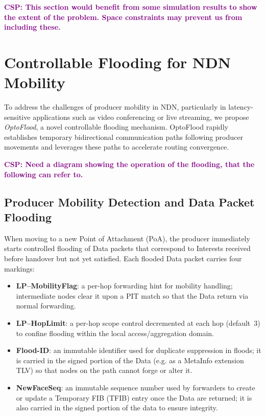 \documentclass[10pt,conference]{IEEEtran}
\newcommand{\csp}[1]{\textbf{\textcolor{purple}{CSP: #1}}}
\begin{document}
\csp{This section would benefit from some simulation results to show the extent of the problem. Space constraints may prevent us from including these.}

\section{Controllable Flooding for NDN Mobility} 
\label{sec:solution}

To address the challenges of producer mobility in NDN, particularly in latency-sensitive applications such as video conferencing or live streaming, we propose \textit{OptoFlood}, a novel controllable flooding mechanism. OptoFlood rapidly establishes temporary bidirectional communication paths following producer movements and leverages these paths to accelerate routing convergence.

\csp{Need a diagram showing the operation of the flooding, that the following can refer to.}

\subsection{Producer Mobility Detection and Data Packet Flooding}
\label{sec:solution:data-flooding}

When moving to a new Point of Attachment (PoA), the producer immediately starts controlled flooding of Data packets that correspond to Interests received before handover but not yet satisfied. Each flooded Data packet carries four markings:

\begin{itemize}
  \item \textbf{LP--MobilityFlag}: a per-hop forwarding hint for mobility handling; intermediate nodes clear it upon a PIT match so that the Data return via normal forwarding.
  \item \textbf{LP--HopLimit}: a per-hop scope control decremented at each hop (default~3) to confine flooding within the local access/aggregation domain.
  \item \textbf{Flood-ID}: an immutable identifier used for duplicate suppression in floods; it is carried in the signed portion of the Data (e.g. as a MetaInfo extension TLV) so that nodes on the path cannot forge or alter it.
  \item \textbf{NewFaceSeq}: an immutable sequence number used by forwarders to create or update a Temporary FIB (TFIB) entry once the Data are returned; it is also carried in the signed portion of the data to ensure integrity.
\end{itemize}
\end{document}
